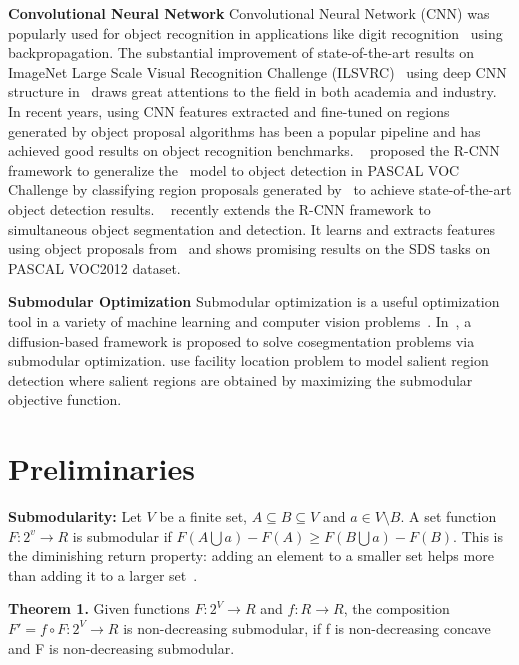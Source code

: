 \documentclass[10pt,twocolumn,letterpaper]{article}
\begin{document}
{\bf Convolutional Neural Network} Convolutional Neural Network (CNN) was popularly used for object recognition in applications like digit recognition~\cite{lecun1989backpropagation} using backpropagation. The substantial improvement of state-of-the-art results on ImageNet Large Scale Visual Recognition Challenge (ILSVRC)~\cite{deng2012imagenet} using deep CNN structure in~\cite{krizhevsky2012imagenet} draws great attentions to the field in both academia and industry. In recent years, using CNN features extracted and fine-tuned on regions generated by object proposal algorithms has been a popular pipeline and has achieved good results on object recognition benchmarks. ~\cite{girshick14CVPR} proposed the R-CNN framework to generalize the~\cite{krizhevsky2012imagenet} model to object detection in PASCAL VOC Challenge by classifying region proposals generated by~\cite{Sande11} to achieve state-of-the-art object detection results. ~\cite{Hariharan14} recently extends the R-CNN framework to simultaneous object segmentation and detection. It learns and extracts features using object proposals from~\cite{Arbelaez14} and shows promising results on the SDS tasks on PASCAL VOC2012 dataset.

{\bf Submodular Optimization} Submodular optimization is a useful optimization tool in a variety of machine learning and computer vision problems~\cite{Liu13, Kim12CVPR, Jiang13, Liu14, Zhu14}. In~\cite{Kim12CVPR}, a diffusion-based framework is proposed to solve cosegmentation problems via submodular optimization. \cite{Jiang13} use facility location problem to model salient region detection where salient regions are obtained by maximizing the submodular objective function. 

\section{Preliminaries}
\textbf{Submodularity:} Let $V$ be a finite set, $A\subseteq B \subseteq V$ and $a \in V\setminus B$. A set function $F: 2^v \rightarrow R$ is submodular if $F(A\bigcup a)-F(A)\geqslant F(B\bigcup a)-F(B)$. This is the diminishing return property: adding an element to a smaller set helps more than adding it to a larger set~\cite{Nemhauser78}.

\textbf{Theorem 1.} Given functions $F: 2^V\rightarrow R$ and $f:R\rightarrow R$, the composition $F'=f\circ F: 2^V \rightarrow R$ is non-decreasing submodular, if f is non-decreasing concave and F is non-decreasing submodular. 
\end{document}
